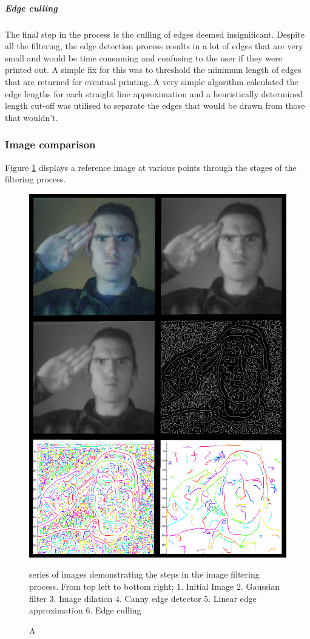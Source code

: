 \subparagraph{Edge culling}
The final step in the process is the culling of edges deemed insignificant. Despite all the filtering, the edge detection process results in a lot of edges that are very small and would be time consuming and confusing to the user if they were printed out. A simple fix for this was to threshold the minimum length of edges that are returned for eventual printing. A very simple algorithm calculated the edge lengths for each straight line approximation and a heuristically determined length cut-off was utilised to separate the edges that would be drawn from those that wouldn't.

\subsubsection{Image comparison}
Figure \ref{fig:demo} displays a reference image at various points through the stages of the filtering process.

\begin{figure}  
\includegraphics[width=\textwidth]{figures/systemDesign/demo.png}
\caption[Image filtering process] A series of images demonstrating the steps in the image filtering process. From top left to bottom right; 1. Initial Image 2. Gaussian filter 3. Image dilation 4. Canny edge detector 5. Linear edge approximation 6. Edge culling {
\label{fig:demo}}
\end{figure}
